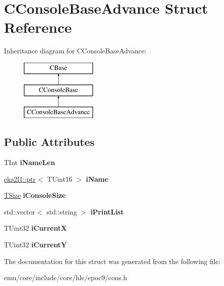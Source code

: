 \hypertarget{struct_c_console_base_advance}{}\section{C\+Console\+Base\+Advance Struct Reference}
\label{struct_c_console_base_advance}
Inheritance diagram for C\+Console\+Base\+Advance\+:\begin{figure}[H]
\begin{center}
\leavevmode
\includegraphics[height=3.000000cm]{struct_c_console_base_advance}
\end{center}
\end{figure}
\subsection*{Public Attributes}
\begin{DoxyCompactItemize}
\item 
\mbox{\label{struct_c_console_base_advance_aa8d03c384b151f18d194bfe56fea7ac1}} 
T\+Int {\bfseries i\+Name\+Len}
\item 
\mbox{\label{struct_c_console_base_advance_acd980196eb10f4c41f9844ae00272163}} 
\mbox{\hyperlink{classeka2l1_1_1ptr}{eka2l1\+::ptr}}$<$ T\+Uint16 $>$ {\bfseries i\+Name}
\item 
\mbox{\label{struct_c_console_base_advance_a6e298276985f99fce2c4624f24e6f0f4}} 
\mbox{\hyperlink{struct_t_size}{T\+Size}} {\bfseries i\+Console\+Size}
\item 
\mbox{\label{struct_c_console_base_advance_a2479534a6002c31b25a26561fdacec93}} 
std\+::vector$<$ std\+::string $>$ {\bfseries i\+Print\+List}
\item 
\mbox{\label{struct_c_console_base_advance_a53ab35ee99573db6a7b4b63637a0a379}} 
T\+Uint32 {\bfseries i\+CurrentX}
\item 
\mbox{\label{struct_c_console_base_advance_a34ce5e5b00e3b24ec4cd58547b36eb8d}} 
T\+Uint32 {\bfseries i\+CurrentY}
\end{DoxyCompactItemize}


The documentation for this struct was generated from the following file\+:\begin{DoxyCompactItemize}
\item 
emu/core/include/core/hle/epoc9/cons.\+h\end{DoxyCompactItemize}
